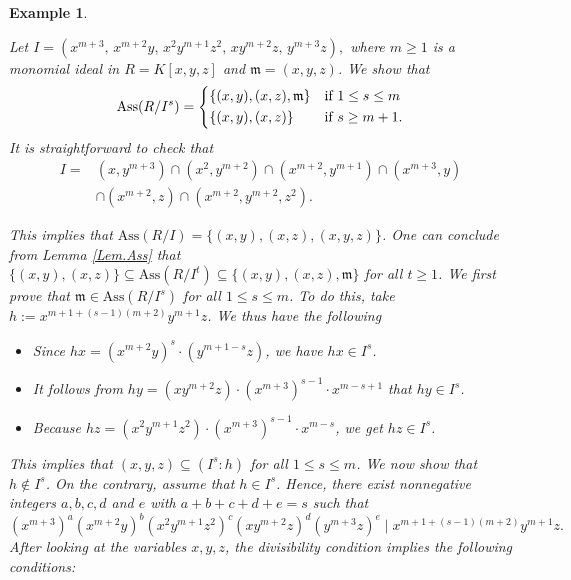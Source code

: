\documentclass[11pt]{amsart}
\newtheorem{example}[theorem]{Example}
\begin{document}
 
\medskip
\begin{example}  \label{Ex.Ass.PandN.2}
\em{
Let $I=(x^{m+3},\,x^{m+2}y,\,x^2y^{m+1}z^2,\,xy^{m+2}z,\,y^{m+3}z),$ where $m\geq 1$  is  a monomial ideal in  $R=K[x,y,z]$ and 
$\mathfrak{m}=(x,y,z)$.   We show  that 
\[
\mathrm{Ass}(R/I^s) =
    \begin{dcases}
    \{(x,y), (x,z), \mathfrak{m}\} & \text{if } 1\leq s\leq m\\
\{(x,y), (x,z)\}  & \text{if } s\geq m+1. \\
                 \end{dcases}
\]
It is straightforward to check that
\begin{align*}
I ={} & (x,y^{m+3})\cap (x^2,y^{m+2})\cap (x^{m+2}, y^{m+1}) \cap (x^{m+3}, y)\\
& \cap (x^{m+2},z) \cap (x^{m+2}, y^{m+2}, z^2).
\end{align*}

This implies that $\mathrm{Ass}(R/I)=\{(x,y), (x,z), (x,y,z)\}$. One can conclude from Lemma \ref{Lem.Ass}  that 
 $ \{(x,y), (x,z)\} \subseteq \mathrm{Ass}(R/I^t) \subseteq \{(x,y), (x,z), \mathfrak{m}\}$ for all $t\geq 1$. 
We first prove that $\mathfrak{m}\in \mathrm{Ass}(R/I^s)$ for all $1\leq s\leq m$. 
To do this, take $h:=x^{m+1+(s-1)(m+2)}y^{m+1}z$. We thus have the following 
\begin{itemize}
\item[$\bullet$] Since $hx = (x^{m+2}y)^s \cdot (y^{m+1-s}z)$, we have $hx \in I^s$.
\item[$\bullet$] It follows from $hy = (xy^{m+2}z) \cdot (x^{m+3})^{s-1} \cdot x^{m-s+1}$ that $hy\in I^s$.
\item[$\bullet$] Because $hz = (x^2y^{m+1}z^2) \cdot (x^{m+3})^{s-1} \cdot x^{m-s}$, we get $hz\in I^s$. 
\end{itemize}
 This implies that   $(x,y,z) \subseteq (I^s:h)$ for all $1\leq s \leq m$. We now show  that $h\notin I^s$. On the contrary, assume that  $h\in I^s$. Hence, there exist    nonnegative integers $a,b,c,d$ and $e$ with   $a+b+c+d+e=s$    such that 
  $$(x^{m+3})^a (x^{m+2}y)^b (x^2y^{m+1}z^2)^c (xy^{m+2}z)^d (y^{m+3}z)^e \mid  x^{m+1+(s-1)(m+2)}y^{m+1}z.$$
  After looking at the variables $x,y,z$, the divisibility condition implies the following conditions:
  
}
\end{example}
\end{document}
